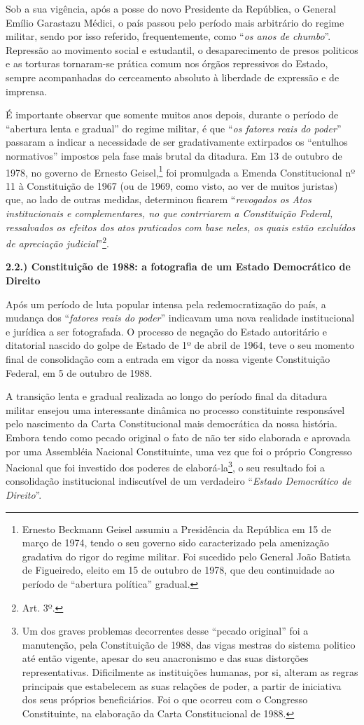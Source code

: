 Sob a sua vigência, após a posse do novo Presidente da República, o
General Emílio Garastazu Médici, o país passou pelo período mais
arbitrário do regime militar, sendo por isso referido, frequentemente,
como ``\emph{os anos de chumbo}''. Repressão ao movimento social e
estudantil, o desaparecimento de presos politicos e as torturas
tornaram-se prática comum nos órgãos repressivos do Estado, sempre
acompanhadas do cerceamento absoluto à liberdade de expressão e de
imprensa.

É importante observar que somente muitos anos depois, durante o período
de ``abertura lenta e gradual'' do regime militar, é que ``\emph{os
fatores reais do poder}'' passaram a indicar a necessidade de ser
gradativamente extirpados os ``entulhos normativos'' impostos pela fase
mais brutal da ditadura. Em 13 de outubro de 1978, no governo de Ernesto
Geisel,\footnote{Ernesto Beckmann Geisel assumiu a Presidência da
  República em 15 de março de 1974, tendo o seu governo sido
  caracterizado pela amenização gradativa do rigor do regime militar.
  Foi sucedido pelo General João Batista de Figueiredo, eleito em 15 de
  outubro de 1978, que deu continuidade ao período de ``abertura
  política'' gradual.} foi promulgada a Emenda Constitucional nº 11 à
Constituição de 1967 (ou de 1969, como visto, ao ver de muitos juristas)
que, ao lado de outras medidas, determinou ficarem ``\emph{revogados os
Atos institucionais e complementares, no que contrriarem a Constituição
Federal, ressalvados os efeitos dos atos praticados com base neles, os
quais estão excluídos de apreciação judicial}''\footnote{Art. 3º.}.

\textbf{2.2.) Constituição de 1988: a fotografia de um Estado
Democrático de Direito}

Após um período de luta popular intensa pela redemocratização do país, a
mudança dos ``\emph{fatores reais do poder}'' indicavam uma nova
realidade institucional e jurídica a ser fotografada. O processo de
negação do Estado autoritário e ditatorial nascido do golpe de Estado de
1º de abril de 1964, teve o seu momento final de consolidação com a
entrada em vigor da nossa vigente Constituição Federal, em 5 de outubro
de 1988.

A transição lenta e gradual realizada ao longo do período final da
ditadura militar ensejou uma interessante dinâmica no processo
constituinte responsável pelo nascimento da Carta Constitucional mais
democrática da nossa história. Embora tendo como pecado original o fato
de não ter sido elaborada e aprovada por uma Assembléia Nacional
Constituinte, uma vez que foi o próprio Congresso Nacional que foi
investido dos poderes de elaborá-la\footnote{Um dos graves problemas
  decorrentes desse ``pecado original'' foi a manutenção, pela
  Constituição de 1988, das vigas mestras do sistema politico até então
  vigente, apesar do seu anacronismo e das suas distorções
  representativas. Dificilmente as instituições humanas, por si, alteram
  as regras principais que estabelecem as suas relações de poder, a
  partir de iniciativa dos seus próprios beneficiários. Foi o que
  ocorreu com o Congresso Constituinte, na elaboração da Carta
  Constitucional de 1988.}, o seu resultado foi a consolidação
institucional indiscutível de um verdadeiro ``\emph{Estado Democrático
de Direito}''.

